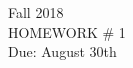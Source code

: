 \documentclass[10pt,oneside]{article}
\begin{document}
\begin{center}
\large{Fall 2018}\\
HOMEWORK \# 1\\
\small{Due: August 30th}
\end{center}

\nocite{Ross2012}
\printbibliography
\end{document}
